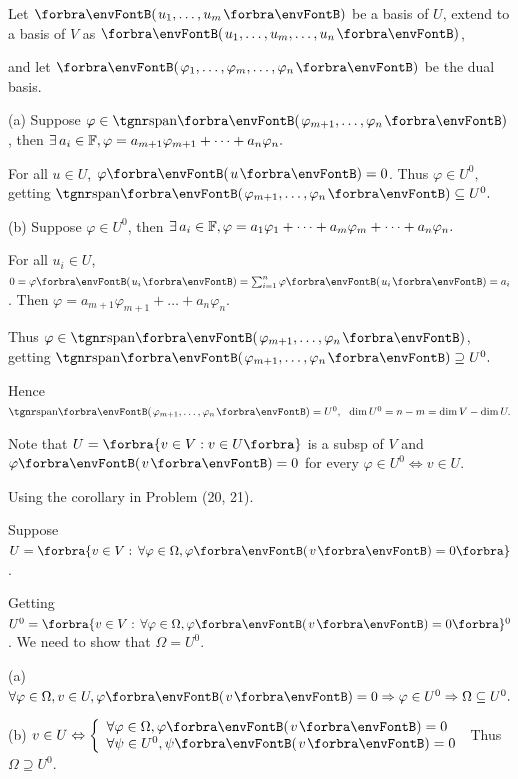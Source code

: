\documentclass[a4paper, 11pt, UTF8]{article}
\begin{document}
\begin{large}
\par\quad
Let $\Par{u_1,\dots,u_m}$ be a basis of $U$, extend to a basis of $V$ as $\Par{u_1,\dots,u_m,\dots,u_n}$,\par\quad
and let $\Par{\varphi_1,\dots,\varphi_m,\dots,\varphi_n}$ be the dual basis.\par\quad
(a) Suppose $\varphi\in\Span{\varphi_{m+1},\dots,\varphi_n}$, then $\exists\,a_i\in{\mathbb{F}},\varphi=a_{m+1}\varphi_{m+1}+\dots+a_n\varphi_n.$\par\quad\Ha
For all $u\in U$, $\varphi\Par{u}=0$. Thus $\varphi\in U^0,$ getting $\Span{\varphi_{m+1},\dots,\varphi_n}\subseteq U^0.$\par\quad
(b) Suppose $\varphi\in U^0$, then $\exists\,a_i\in{\mathbb{F}},\varphi=a_1\varphi_1+\dots+a_m\varphi_m+\dots+a_n\varphi_n.$\par\quad\Hb
For all $u_i\in U$, $0=\varphi\Par{u_i}=\sum_{i=1}^n \varphi\Par{u_i}=a_i$. Then $\varphi=a_{m+1}\varphi_{m+1}+\dots+a_n\varphi_n.$\par\quad\Hb
Thus $\varphi\in\Span{\varphi_{m+1},\dots,\varphi_n}$, getting $\Span{\varphi_{m+1},\dots,\varphi_n}\supseteq U^0.$\par\quad
Hence $\Span{\varphi_{m+1},\dots,\varphi_n}=U^0,\,\,\,\,\dim U^0=n-m=\dim V-\dim U.$\PfEnd
\SepLine

Note that $U=\Bra{v\in V:v\in U}$ is a subsp of $V$ and $\varphi\Par{v}=0$ for every $\varphi\in U^0 \Longleftrightarrow v\in U.$\PfEnd
\SepLine

Using the corollary in Problem (20, 21).\par\quad
Suppose $U=\Bra{v\in V:\,\forall\varphi\in\Omega,\varphi\Par{v}=0}$.\par\quad
\dbsp Getting $U^0=\Bra{v\in V:\,\forall\varphi\in\Omega,\varphi\Par{v}=0}{^0}$. We need to show that $\Omega=U^0$.\par\hspace{0pt}
(a) $\forall\varphi\in\Omega,v\in U,\varphi\Par{v}=0\Rightarrow\varphi\in U^0\Rightarrow\Omega\subseteq U^0.$\par\quad
(b) $v\in U\Leftrightarrow\MathLeftBrace{l}{ \forall\varphi\in\Omega,\varphi\Par{v}=0\\ \forall\psi\in U^0,\psi\Par{v}=0}$ Thus $\Omega\supseteq U^0.$\PfEnd
\SepLine


\end{large}
\end{document}
